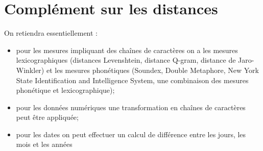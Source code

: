 \section{Compl\'ement sur les distances}
On retiendra essentiellement \cite{bensalem}:
\begin{itemize}[parsep=0cm,itemsep=0cm]
\item pour les mesures impliquant des chaînes de caractères on a les mesures lexicographiques (distances Levenshtein, distance Q-gram, distance de Jaro-Winkler) et les mesures phon\'etiques (Soundex, Double Metaphore, New York State Identification and Intelligence System, une combinaison des mesures phon\'etique et lexicographique);
\item pour les donn\'ees num\'eriques une transformation en chaînes de caractères peut \^etre appliqu\'ee;
\item pour les dates on peut effectuer un calcul de différence entre les jours, les mois et les années
\end{itemize} 
